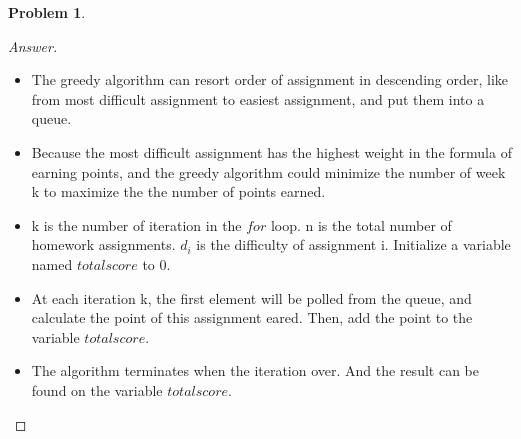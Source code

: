\documentclass[11pt]{article}
\theoremstyle{definition}
\theoremstyle{definition}
\newtheorem{required}{Problem}
\theoremstyle{definition}
\begin{document}
\begin{required}
\begin{enumerate}[label=(\alph*)]
\begin{proof}[Answer]
\begin{itemize}
\item The greedy algorithm can resort order of assignment in descending order, like from most difficult assignment to easiest assignment, and put them into a queue.
\item Because the most difficult assignment has the highest weight in the formula of earning points, and the greedy algorithm could minimize the number of week k to maximize the the number of points earned.
\item k is the number of iteration in the $for$ loop. n is the total number of homework assignments. $d_i$ is the difficulty of assignment i. Initialize a variable named $total score$ to 0.
\item At each iteration k, the first element will be polled from the queue, and calculate the point of this assignment eared. Then, add the point to the variable $total score$.
\item The algorithm terminates when the iteration over. And the result can be found on the variable $total score$.
\end{itemize}
\end{proof}

\end{enumerate}
\end{required}




\end{document}
